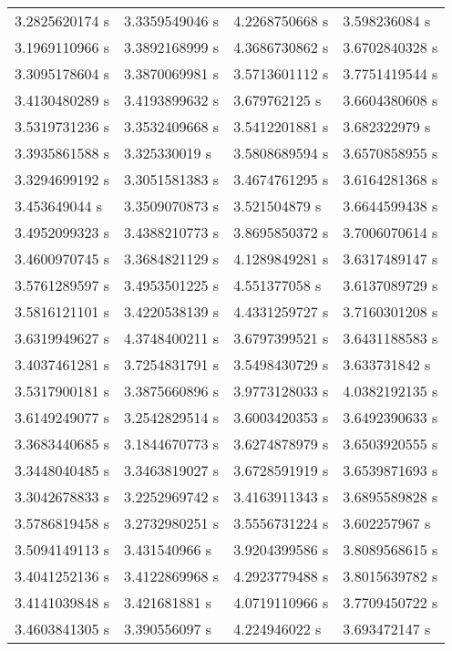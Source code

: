 \begin{table}
\begin{tabular}{llll}
    3.2825620174 s & 3.3359549046 s & 4.2268750668 s & 3.598236084 s  \\
    3.1969110966 s & 3.3892168999 s & 4.3686730862 s & 3.6702840328 s \\
    3.3095178604 s & 3.3870069981 s & 3.5713601112 s & 3.7751419544 s \\
    3.4130480289 s & 3.4193899632 s & 3.679762125 s  & 3.6604380608 s \\
    3.5319731236 s & 3.3532409668 s & 3.5412201881 s & 3.682322979 s  \\
    3.3935861588 s & 3.325330019 s  & 3.5808689594 s & 3.6570858955 s \\
    3.3294699192 s & 3.3051581383 s & 3.4674761295 s & 3.6164281368 s \\
    3.453649044 s  & 3.3509070873 s & 3.521504879 s  & 3.6644599438 s \\
    3.4952099323 s & 3.4388210773 s & 3.8695850372 s & 3.7006070614 s \\
    3.4600970745 s & 3.3684821129 s & 4.1289849281 s & 3.6317489147 s \\
    3.5761289597 s & 3.4953501225 s & 4.551377058 s  & 3.6137089729 s \\
    3.5816121101 s & 3.4220538139 s & 4.4331259727 s & 3.7160301208 s \\
    3.6319949627 s & 4.3748400211 s & 3.6797399521 s & 3.6431188583 s \\
    3.4037461281 s & 3.7254831791 s & 3.5498430729 s & 3.633731842 s  \\
    3.5317900181 s & 3.3875660896 s & 3.9773128033 s & 4.0382192135 s \\
    3.6149249077 s & 3.2542829514 s & 3.6003420353 s & 3.6492390633 s \\
    3.3683440685 s & 3.1844670773 s & 3.6274878979 s & 3.6503920555 s \\
    3.3448040485 s & 3.3463819027 s & 3.6728591919 s & 3.6539871693 s \\
    3.3042678833 s & 3.2252969742 s & 3.4163911343 s & 3.6895589828 s \\
    3.5786819458 s & 3.2732980251 s & 3.5556731224 s & 3.602257967 s  \\
    3.5094149113 s & 3.431540966 s  & 3.9204399586 s & 3.8089568615 s \\
    3.4041252136 s & 3.4122869968 s & 4.2923779488 s & 3.8015639782 s \\
    3.4141039848 s & 3.421681881 s  & 4.0719110966 s & 3.7709450722 s \\
    3.4603841305 s & 3.390556097 s  & 4.224946022 s  & 3.693472147 s  \\

\end{tabular}
\end{table}
